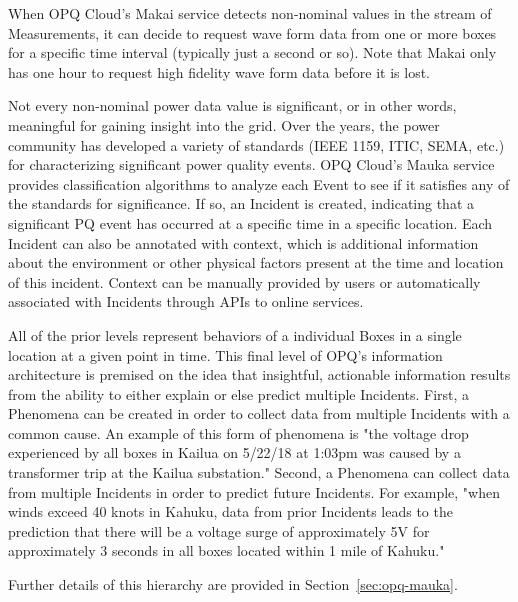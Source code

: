 When OPQ Cloud's Makai service detects non-nominal values in the stream of Measurements, it can decide to request wave form data from one or more boxes for a specific time interval (typically just a second or so). Note that Makai only has one hour to request high fidelity wave form data before it is lost.

Not every non-nominal power data value is significant, or in other words, meaningful for gaining insight into the grid. Over the years, the power community has developed a variety of standards (IEEE 1159, ITIC, SEMA, etc.) for characterizing significant power quality events. OPQ Cloud's Mauka service provides classification algorithms to analyze each Event to see if it satisfies any of the standards for significance. If so, an Incident is created, indicating that a significant PQ event has occurred at a specific time in a specific location. Each Incident can also be annotated with context, which is additional information about the environment or other physical factors present at the time and location of this incident. Context can be manually provided by users or automatically associated with Incidents through APIs to online services.

All of the prior levels represent behaviors of a individual Boxes in a single location at a given point in time. This final level of OPQ's information architecture is premised on the idea that insightful, actionable information results from the ability to either explain or else predict multiple Incidents. First, a Phenomena can be created in order to collect data from multiple Incidents with a common cause. An example of this form of phenomena is "the voltage drop experienced by all boxes in Kailua on 5/22/18 at 1:03pm was caused by a transformer trip at the Kailua substation." Second, a Phenomena can collect data from multiple Incidents in order to predict future Incidents. For example, "when winds exceed 40 knots in Kahuku, data from prior Incidents leads to the prediction that there will be a voltage surge of approximately 5V for approximately 3 seconds in all boxes located within 1 mile of Kahuku."

Further details of this hierarchy are provided in Section~\ref{sec:opq-mauka}.

